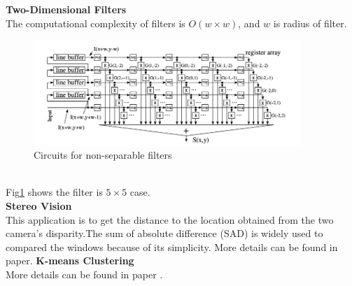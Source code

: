 \noindent \textbf{Two-Dimensional Filters}\\
\indent The computational complexity of filters is $O(w \times w)$, and $w$ is radius of filter.
\begin{figure}[!hbtp]
\centering
\includegraphics[width=0.9\textwidth]{FPGAs/Paper1_1_Cirsuitsfornon-separablefilters}
\caption{Circuits for non-separable filters}
\label{fig1.1}
\end{figure}\\
Fig\ref{fig1.1} shows the filter is $5 \times 5$ case.\\
\noindent \textbf{Stereo Vision}\\
\indent This application is to get the distance to the location obtained from the two camera's disparity.The sum of absolute difference (SAD) is widely used to compared the windows because of its simplicity. 
More details can be found in paper\cite{asano2009performance}.
\noindent\textbf{K-means Clustering}\\
\indent More details can be found in paper \cite{asano2009performance}.
